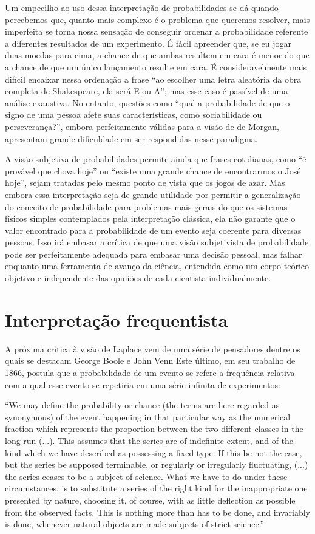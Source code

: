 Um empecilho ao uso dessa interpretação de probabilidades se dá quando percebemos que, quanto mais complexo é o 
problema que queremos resolver, mais imperfeita se torna nossa sensação de conseguir ordenar a probabilidade referente
a diferentes resultados de um experimento. É fácil apreender que, se eu jogar duas moedas para cima, a chance de que ambas 
resultem em cara é menor do que a chance de que um único lançamento resulte em cara. É consideravelmente mais difícil encaixar
nessa ordenação a frase ``ao escolher uma letra aleatória da obra completa de Shakespeare, ela será E ou A''; mas esse caso
é passível de uma análise exaustiva. No entanto, questões como ``qual a probabilidade de que o signo de uma pessoa afete
suas características, como sociabilidade ou perseverança?'', embora perfeitamente válidas para a visão de de Morgan, apresentam
grande dificuldade em ser respondidas nesse paradigma.

A visão subjetiva de probabilidades permite ainda que frases cotidianas, como ``é provável que chova hoje'' ou ``existe uma grande
chance de encontrarmos o José hoje'', sejam tratadas pelo mesmo ponto de vista que os jogos de azar. Mas
embora essa interpretação seja de grande utilidade por permitir a generalização do conceito de probabilidade para problemas
mais gerais do que os sistemas físicos simples contemplados pela interpretação clássica, ela não garante que o valor encontrado
para a probabilidade de um evento seja coerente para diversas pessoas. Isso irá embasar a crítica de que uma visão subjetivista 
de probabilidade pode ser perfeitamente adequada para embasar uma decisão pessoal, mas falhar enquanto uma ferramenta de 
avanço da ciência, entendida como um corpo teórico objetivo e independente das opiniões de cada cientista individualmente.

\section{Interpretação frequentista}
A próxima crítica à visão de Laplace vem de uma série de pensadores dentre os quais se destacam George Boole e John Venn
Este último, em seu trabalho de 
1866, postula que a probabilidade de um evento se refere a frequência relativa com a qual esse evento se repetiria em uma
série infinita de experimentos:

``We may define the probability or chance (the terms are here regarded as synonymous) of the event happening in that
particular way as the numerical fraction which represents the proportion between the two different classes in the long run (...).
This assumes that the series are of indefinite extent, and of the kind which we have described as possessing a fixed type.
If this be not the case, but the series be supposed terminable, or regularly or irregularly fluctuating, (...) the series ceases
to be a subject of science. What we have to do under these circumstances, is to substitute a series of the right kind for
the inappropriate one presented by nature, choosing it, of course, with as little deflection as possible from the observed facts.
This is nothing more than has to be done, and invariably is done, whenever natural objects are made subjects of strict science.''
\citep{Venn1866}

